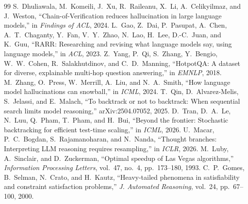 \begin{thebibliography}{99}
 S.~Dhuliawala, M.~Komeili, J.~Xu, R.~Raileanu, X.~Li, A.~Celikyilmaz, and J.~Weston, ``Chain-of-Verification reduces hallucination in large language models,'' in \emph{Findings of ACL}, 2024.
 L.~Gao, Z.~Dai, P.~Pasupat, A.~Chen, A.~T.~Chaganty, Y.~Fan, V.~Y.~Zhao, N.~Lao, H.~Lee, D.-C.~Juan, and K.~Guu, ``RARR: Researching and revising what language models say, using language models,'' in \emph{ACL}, 2023.
 Z.~Yang, P.~Qi, S.~Zhang, Y.~Bengio, W.~W.~Cohen, R.~Salakhutdinov, and C.~D.~Manning, ``HotpotQA: A dataset for diverse, explainable multi-hop question answering,'' in \emph{EMNLP}, 2018.
 M.~Zhang, O.~Press, W.~Merrill, A.~Liu, and N.~A.~Smith, ``How language model hallucinations can snowball,'' in \emph{ICML}, 2024.
 T.~Qin, D.~Alvarez-Melis, S.~Jelassi, and E.~Malach, ``To backtrack or not to backtrack: When sequential search limits model reasoning,'' arXiv:2504.07052, 2025.
 D.~Tran, D.~A.~Le, N.~Luu, Q.~Pham, T.~Pham, and H.~Bui, ``Beyond the frontier: Stochastic backtracking for efficient test-time scaling,'' in \emph{ICML}, 2026.
 U.~Macar, P.~C.~Bogdan, S.~Rajamanoharan, and N.~Nanda, ``Thought branches: Interpreting LLM reasoning requires resampling,'' in \emph{ICLR}, 2026.
 M.~Luby, A.~Sinclair, and D.~Zuckerman, ``Optimal speedup of Las Vegas algorithms,'' \emph{Information Processing Letters}, vol.~47, no.~4, pp.~173--180, 1993.
 C.~P.~Gomes, B.~Selman, N.~Crato, and H.~Kautz, ``Heavy-tailed phenomena in satisfiability and constraint satisfaction problems,'' \emph{J. Automated Reasoning}, vol.~24, pp.~67--100, 2000.
\end{thebibliography}
